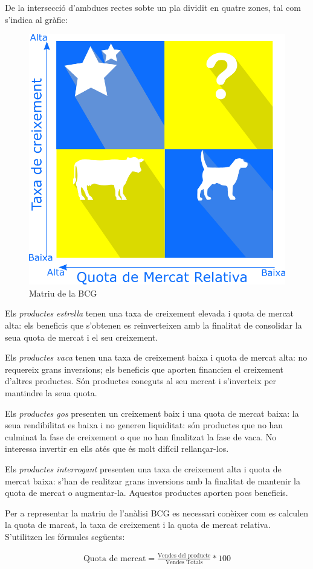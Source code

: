 \documentclass[
]{book}
\begin{document}
De la intersecció d'ambdues rectes sobte un pla dividit en quatre zones, tal com s'indica al gràfic:

\begin{figure}

{\centering \includegraphics[width=0.5\linewidth]{bcgmatriz} 

}

\caption{Matriu de la BCG}\label{fig:unnamed-chunk-3}
\end{figure}

Els \emph{productes estrella} tenen una taxa de creixement elevada i quota de mercat alta: els beneficis que s'obtenen es reinverteixen amb la finalitat de consolidar la seua quota de mercat i el seu creixement.

Els \emph{productes vaca} tenen una taxa de creixement baixa i quota de mercat alta: no requereix grans inversions; els beneficis que aporten financien el creixement d'altres productes. Són productes coneguts al seu mercat i s'inverteix per mantindre la seua quota.

Els \emph{productes gos} presenten un creixement baix i una quota de mercat baixa: la seua rendibilitat es baixa i no generen liquiditat: són productes que no han culminat la fase de creixement o que no han finalitzat la fase de vaca. No interessa invertir en ells atés que és molt difícil rellançar-los.

Els \emph{productes interrogant} presenten una taxa de creixement alta i quota de mercat baixa: s'han de realitzar grans inversions amb la finalitat de mantenir la quota de mercat o augmentar-la. Aquestos productes aporten pocs beneficis.

Per a representar la matriu de l'anàlisi BCG es necessari conèixer com es calculen la quota de marcat, la taxa de creixement i la quota de mercat relativa. S'utilitzen les fórmules següents:

\[\begin{equation} 
\begin{split}
\mbox{Quota de mercat}=\frac{\mbox{Vendes del producte}}{\mbox{Vendes Totals}} * 100
\end{split}
\end{equation} \]
\end{document}
